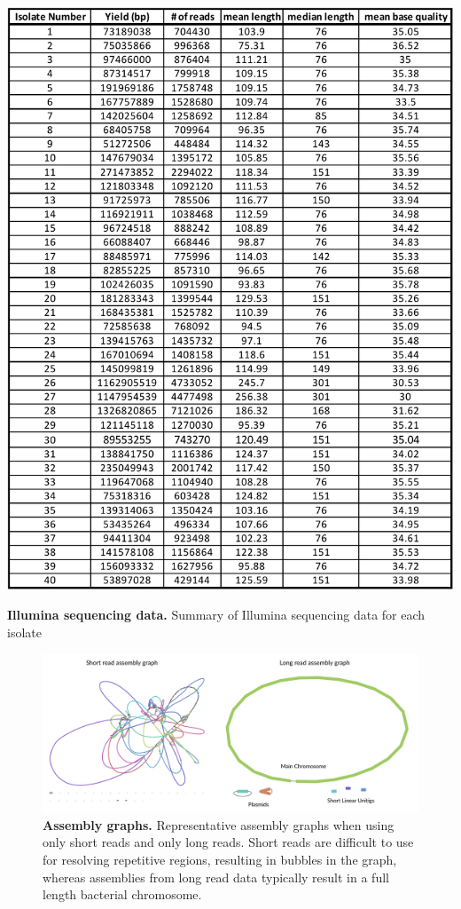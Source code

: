 \begin{table}[!ht]
\centering
\includegraphics[width = .7\linewidth,keepaspectratio]{figure/runillumina.pdf}
\caption[Illumina sequencing data]{{\bf Illumina sequencing data.} Summary of Illumina sequencing data for each isolate }
\label{tab:runillumina}
\end{table}


\begin{figure}[!ht]
\centering
\includegraphics[width = 1\linewidth,keepaspectratio]{figure/graphsasm.pdf}
\caption[Assembly graphs]{{\bf Assembly graphs.} Representative assembly graphs when using only short reads and only long reads. Short reads are difficult to use for resolving repetitive regions, resulting in bubbles in the graph, whereas assemblies from long read data typically result in a full length bacterial chromosome. }
\label{fig:graphsasm}
\end{figure}



